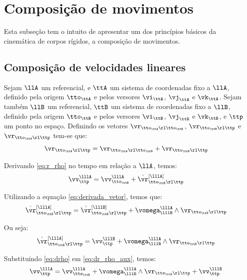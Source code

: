 \documentclass[]{politex}
\begin{document}
\section{Composição de movimentos}\label{S05-01-03}

Esta subseção tem o intuito de apresentar um dos princípios básicos da cinemática de corpos rígidos, a composição de movimentos.

\subsection{Composição de velocidades lineares}\label{S05-01-03-01}

Sejam $\llA$ um referencial, e $\ttA$ um sistema de coordenadas fixo a $\llA$, definido pela origem $\tto_\ttA$ e pelos versores $\vi_\ttA$, $\vj_\ttA$ e $\vk_\ttA$. Sejam também $\llB$ um referencial, $\ttB$ um sistema de coordenadas fixo a $\llB$, definido pela origem $\tto_\ttB$ e pelos versores $\vi_\ttB$, $\vj_\ttB$ e $\vk_\ttB$, e $\ttp$ um ponto no espaço. Definindo os vetores $\vr_{\tto_\ttA \rl \tto_\ttB}$, $\vr_{\tto_\ttB \rl \ttp}$ e $\vr_{\tto_\ttA \rl \ttp}$ tem-se que:
\begin{equation} \label{eq:r_rho}
\vr_{\tto_\ttA \rl \ttp} = \vr_{\tto_\ttA \rl \tto_\ttB} + \vr_{\tto_\ttB \rl \ttp}
\end{equation}

Derivando \eqref{eq:r_rho} no tempo em relação a $\llA$, temos:
\begin{equation} \label{eq:dr_rho_aux}
\vv_\ttp^{\lllA} = \vv_{\tto_\ttB}^{\lllA} + \dot{\vr}_{\tto_\ttB \rl \ttp}^{[\lllA]}
\end{equation}

Utilizando a equação \eqref{eq:derivada_vetor}, temos que:
\begin{equation} 
\dot{\vr}_{\tto_\ttB \rl \ttp}^{[\lllA]} = \dot{\vr}_{\tto_\ttB \rl \ttp}^{[\lllB]} + \vomega_{\lllB}^{\lllA}  \wedge  \vr_{\tto_\ttB \rl \ttp} 
\end{equation}


Ou seja:
\begin{equation} \label{eq:drho}
\dot{\vr}_{\tto_\ttB \rl \ttp}^{[\lllA]} =   \vv_\ttp^{\lllB} + \vomega_{\lllB}^{\lllA} \wedge \vr_{\tto_\ttB \rl \ttp} 
\end{equation}

Substituindo \eqref{eq:drho} em \eqref{eq:dr_rho_aux}, temos:
\begin{equation} \label{eq:dr_rho}
\vv_\ttp^{\lllA} = \vv_{\tto_\ttB}^{\lllA}  + \vomega_{\lllB}^{\lllA} \wedge \vr_{\tto_\ttB \rl \ttp}  + \vv_\ttp^{\lllB}
\end{equation}
\end{document}
